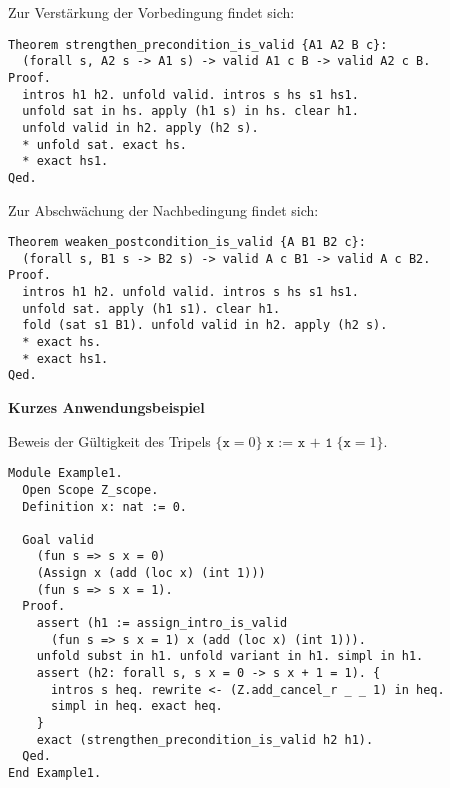 \documentclass[8pt,fleqn,aspectratio=169]{beamer}
\newcommand{\strong}[1]{\textsf{\textbf{#1}}}
\newcommand{\parspace}{\vspace{0.8em}}
\newcommand{\code}[1]{{\texttt{#1}}}
\begin{document}
\begin{frame}[fragile]
Zur Verstärkung der Vorbedingung findet sich:

\begin{small}
\begin{lstlisting}[language=Coq, xleftmargin=\mathindent]
Theorem strengthen_precondition_is_valid {A1 A2 B c}:
  (forall s, A2 s -> A1 s) -> valid A1 c B -> valid A2 c B.
Proof.
  intros h1 h2. unfold valid. intros s hs s1 hs1.
  unfold sat in hs. apply (h1 s) in hs. clear h1.
  unfold valid in h2. apply (h2 s).
  * unfold sat. exact hs.
  * exact hs1.
Qed.
\end{lstlisting}
\end{small}

Zur Abschwächung der Nachbedingung findet sich:

\begin{small}
\begin{lstlisting}[language=Coq, xleftmargin=\mathindent]
Theorem weaken_postcondition_is_valid {A B1 B2 c}:
  (forall s, B1 s -> B2 s) -> valid A c B1 -> valid A c B2.
Proof.
  intros h1 h2. unfold valid. intros s hs s1 hs1.
  unfold sat. apply (h1 s1). clear h1.
  fold (sat s1 B1). unfold valid in h2. apply (h2 s).
  * exact hs.
  * exact hs1.
Qed.
\end{lstlisting}
\end{small}
\end{frame}

\begin{frame}[fragile]
\strong{Kurzes Anwendungsbeispiel}

\parspace
Beweis der Gültigkeit des Tripels
$\{\mathtt x = 0\}\; \code{x := x + 1}\; \{\mathtt x = 1\}$.\pause

\begin{small}
\begin{lstlisting}[language=Coq, xleftmargin=\mathindent]
Module Example1.
  Open Scope Z_scope.
  Definition x: nat := 0.

  Goal valid
    (fun s => s x = 0)
    (Assign x (add (loc x) (int 1)))
    (fun s => s x = 1).
  Proof.
    assert (h1 := assign_intro_is_valid
      (fun s => s x = 1) x (add (loc x) (int 1))).
    unfold subst in h1. unfold variant in h1. simpl in h1.
    assert (h2: forall s, s x = 0 -> s x + 1 = 1). {
      intros s heq. rewrite <- (Z.add_cancel_r _ _ 1) in heq.
      simpl in heq. exact heq.
    }
    exact (strengthen_precondition_is_valid h2 h1).
  Qed.
End Example1.
\end{lstlisting}
\end{small}
\end{frame}
\end{document}
